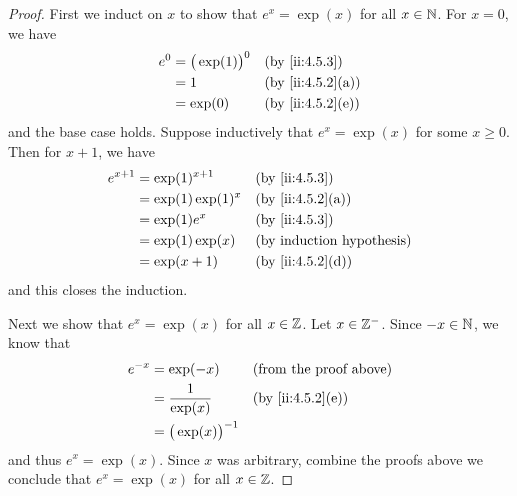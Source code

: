 \begin{proof}
  First we induct on \(x\) to show that \(e^x = \exp(x)\) for all \(x \in \mathbb{N}\).
  For \(x = 0\), we have
  \begin{align*}
    e^0 & = \big(\exp(1)\big)^0 &  & \by{ii:4.5.3}    \\
        & = 1                   &  & \by{ii:4.5.2}[a] \\
        & = \exp(0)             &  & \by{ii:4.5.2}[e]
  \end{align*}
  and the base case holds.
  Suppose inductively that \(e^x = \exp(x)\) for some \(x \geq 0\).
  Then for \(x + 1\), we have
  \begin{align*}
    e^{x + 1} & = \exp(1)^{x + 1}   &  & \by{ii:4.5.3}    \\
              & = \exp(1) \exp(1)^x &  & \by{ii:4.5.2}[a] \\
              & = \exp(1) e^x       &  & \by{ii:4.5.3}    \\
              & = \exp(1) \exp(x)   &  & \byIH            \\
              & = \exp(x + 1)       &  & \by{ii:4.5.2}[d]
  \end{align*}
  and this closes the induction.

  Next we show that \(e^x = \exp(x)\) for all \(x \in \mathbb{Z}\).
  Let \(x \in \mathbb{Z}^-\).
  Since \(-x \in \mathbb{N}\), we know that
  \begin{align*}
    e^{-x} & = \exp(-x)               &  & \text{(from the proof above)} \\
           & = \dfrac{1}{\exp(x)}     &  & \by{ii:4.5.2}[e]              \\
           & = \big(\exp(x)\big)^{-1}
  \end{align*}
  and thus \(e^x = \exp(x)\).
  Since \(x\) was arbitrary, combine the proofs above we conclude that \(e^x = \exp(x)\) for all \(x \in \mathbb{Z}\).


\end{proof}
